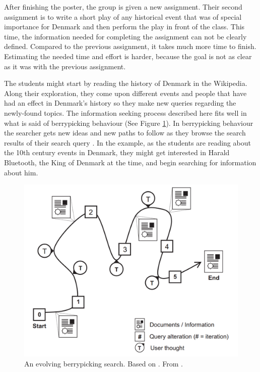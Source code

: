 After finishing the poster, the group is given a new assignment.
Their second assignment is to write a short play of any historical event that was of special importance for Denmark and then perform the play in front of the class.
This time, the information needed for completing the assignment can not be clearly defined. 
Compared to the previous assignment, it takes much more time to finish.
Estimating the needed time and effort is harder, because the goal is not as clear as it was with the previous assignment.

The students might start by reading the history of Denmark in the Wikipedia.
Along their exploration, they come upon different events and people that have had an effect in Denmark's history so they make new queries regarding the newly-found topics.
The information seeking process described here fits well in what is said of berrypicking behaviour (See Figure \ref{figure_bp}).
In berrypicking behaviour the searcher gets new ideas and new paths to follow as they browse the search results of their search query \cite{bates89}.
In the example, as the students are reading about the 10th century events in Denmark, they might get interested in Harald Bluetooth, the King of Denmark at the time, and begin searching for information about him.

\begin{figure}[htp] %
\caption{An evolving berrypicking search. Based on \protect\cite{bates89}. From \protect\cite{march06}.}
\label{figure_bp}
\centering
\includegraphics[scale=0.25]{figures/berrypicking.pdf}
\end{figure}

